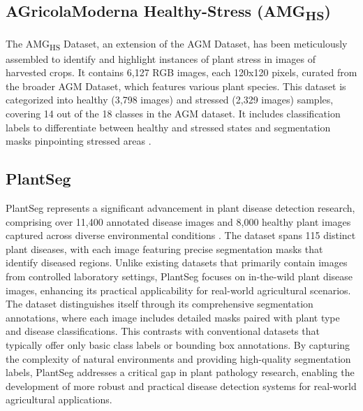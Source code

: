 \documentclass[sn-mathphys]{sn-jnl}
\theoremstyle{thmstyleone}%
\theoremstyle{thmstyletwo}%
\theoremstyle{thmstylethree}%
\begin{document}
\subsection{AGricolaModerna Healthy-Stress (AMG\textsubscript{HS})
}
The AMG\textsubscript{HS} Dataset, an extension of the AGM Dataset, has been meticulously assembled to identify and highlight instances of plant stress in images of harvested crops. It contains 6,127 RGB images, each 120x120 pixels, curated from the broader AGM Dataset, which features various plant species. This dataset is categorized into healthy (3,798 images) and stressed (2,329 images) samples, covering 14 out of the 18 classes in the AGM dataset. It includes classification labels to differentiate between healthy and stressed states and segmentation masks pinpointing stressed areas \citep{Sama_2023_ICCV}.

\subsection{PlantSeg}
PlantSeg represents a significant advancement in plant disease detection research, comprising over 11,400 annotated disease images and 8,000 healthy plant images captured across diverse environmental conditions \citep{wei2024plantseg}. The dataset spans 115 distinct plant diseases, with each image featuring precise segmentation masks that identify diseased regions. Unlike existing datasets that primarily contain images from controlled laboratory settings, PlantSeg focuses on in-the-wild plant disease images, enhancing its practical applicability for real-world agricultural scenarios. The dataset distinguishes itself through its comprehensive segmentation annotations, where each image includes detailed masks paired with plant type and disease classifications. This contrasts with conventional datasets that typically offer only basic class labels or bounding box annotations. By capturing the complexity of natural environments and providing high-quality segmentation labels, PlantSeg addresses a critical gap in plant pathology research, enabling the development of more robust and practical disease detection systems for real-world agricultural applications.
\end{document}
